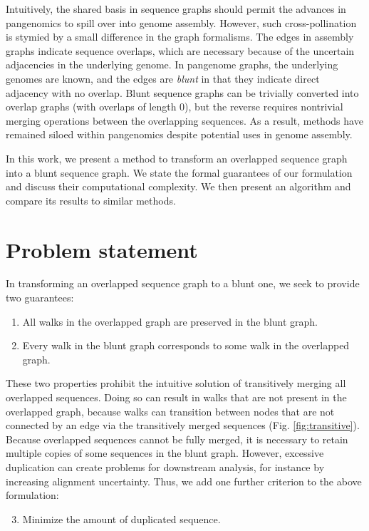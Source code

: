 \documentclass[11pt]{ucthesis}
\newcommand{\figref}[1]{Fig. \ref{fig:#1}}
\begin{document}
Intuitively, the shared basis in sequence graphs should permit the advances in pangenomics to spill over into genome assembly.
However, such cross-pollination is stymied by a small difference in the graph formalisms.
The edges in assembly graphs indicate sequence overlaps, which are necessary because of the uncertain adjacencies in the underlying genome.
In pangenome graphs, the underlying genomes are known, and the edges are \emph{blunt} in that they indicate direct adjacency with no overlap.
Blunt sequence graphs can be trivially converted into overlap graphs (with overlaps of length 0), but the reverse requires nontrivial merging operations between the overlapping sequences.
As a result, methods have remained siloed within pangenomics despite potential uses in genome assembly.

In this work, we present a method to transform an overlapped sequence graph into a blunt sequence graph. 
We state the formal guarantees of our formulation and discuss their computational complexity. 
We then present an algorithm and compare its results to similar methods.

\section{Problem statement}

In transforming an overlapped sequence graph to a blunt one, we seek to provide two guarantees:
\begin{enumerate}
    \item All walks in the overlapped graph are preserved in the blunt graph.
    \item Every walk in the blunt graph corresponds to some walk in the overlapped graph.
\end{enumerate}
These two properties prohibit the intuitive solution of transitively merging all overlapped sequences.
Doing so can result in walks that are not present in the overlapped graph, because walks can transition between nodes that are not connected by an edge via the transitively merged sequences (\figref{transitive}).
Because overlapped sequences cannot be fully merged, it is necessary to retain multiple copies of some sequences in the blunt graph.
However, excessive duplication can create problems for downstream analysis, for instance by increasing alignment uncertainty.
Thus, we add one further criterion to the above formulation:
\begin{enumerate}
  \setcounter{enumi}{2}
  \item Minimize the amount of duplicated sequence.
\end{enumerate}
\end{document}
